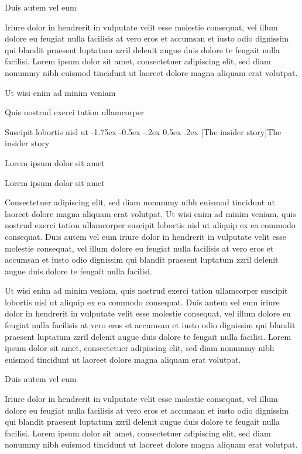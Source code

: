 \documentclass[11pt,twoside]{article}\makeatletter
\makeatletter
\renewcommand\section{\@startsection {section}{1}{\z@}%
     {-1.75ex \@plus -0.5ex \@minus -.2ex}%
     {0.5ex \@plus .2ex}%
     {\reset@font\Large\bfseries\sffamily}}
\renewcommand\subsection{\@startsection{subsection}{2}{\z@}%
     {-1.75ex\@plus -0.5ex \@minus- .2ex}%
     {0.5ex \@plus .2ex}%
     {\reset@font\Large\sffamily}}
\def\DivII{\subsection}
\def\DivII{\section}
\makeatother
\begin{document}
Duis autem vel eum \par
Iriure dolor in hendrerit in vulputate velit esse molestie       consequat, vel illum dolore eu feugiat nulla facilisis at vero eros et       accumsan et iusto odio dignissim qui blandit praesent luptatum zzril       delenit augue duis dolore te feugait nulla facilisi. Lorem ipsum dolor       sit amet, consectetuer adipiscing elit, sed diam nonummy nibh euismod       tincidunt ut laoreet dolore magna aliquam erat volutpat. \par
Ut wisi enim ad minim veniam\par
Quis nostrud exerci tation ullamcorper \par
Suscipit lobortis nisl ut 
\DivII[The insider story]{The insider story}\label{part2.1}\par
Lorem ipsum dolor sit amet\par
Lorem ipsum dolor sit amet\par
Consectetuer adipiscing elit, sed diam nonummy nibh euismod       tincidunt ut laoreet dolore magna aliquam erat volutpat. Ut wisi enim       ad minim veniam, quis nostrud exerci tation ullamcorper suscipit       lobortis nisl ut aliquip ex ea commodo consequat. Duis autem vel eum       iriure dolor in hendrerit in vulputate velit esse molestie consequat,       vel illum dolore eu feugiat nulla facilisis at vero eros et accumsan       et iusto odio dignissim qui blandit praesent luptatum zzril delenit       augue duis dolore te feugait nulla facilisi.\par
Ut wisi enim ad minim veniam, quis nostrud exerci tation       ullamcorper suscipit lobortis nisl ut aliquip ex ea commodo       consequat. Duis autem vel eum iriure dolor in hendrerit in vulputate       velit esse molestie consequat, vel illum dolore eu feugiat nulla       facilisis at vero eros et accumsan et iusto odio dignissim qui blandit       praesent luptatum zzril delenit augue duis dolore te feugait nulla       facilisi. Lorem ipsum dolor sit amet, consectetuer adipiscing elit,       sed diam nonummy nibh euismod tincidunt ut laoreet dolore magna       aliquam erat volutpat. \par
Duis autem vel eum \par
Iriure dolor in hendrerit in vulputate velit esse molestie       consequat, vel illum dolore eu feugiat nulla facilisis at vero eros et       accumsan et iusto odio dignissim qui blandit praesent luptatum zzril       delenit augue duis dolore te feugait nulla facilisi. Lorem ipsum dolor       sit amet, consectetuer adipiscing elit, sed diam nonummy nibh euismod       tincidunt ut laoreet dolore magna aliquam erat volutpat. \par
\end{document}
